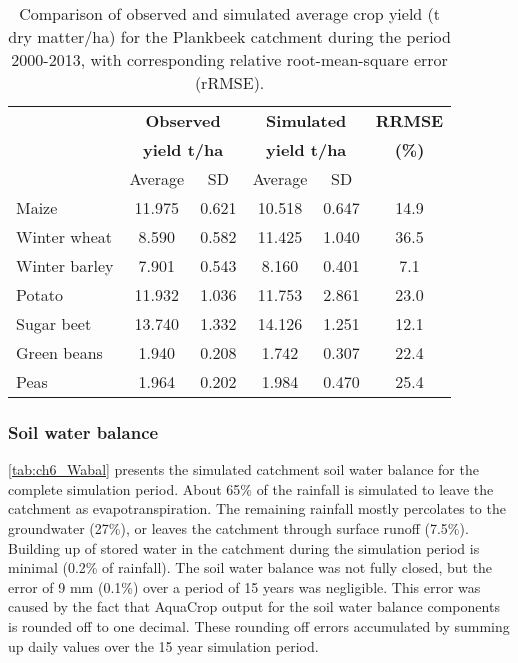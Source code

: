 \begin{table}[htbp]
  \centering
  	\caption{Comparison of observed and simulated average crop yield (t dry matter/ha) for the Plankbeek catchment during the period 2000-2013, with corresponding relative root-mean-square error (rRMSE). }
\begin{tabular}{lccccc}
\toprule
      & \multicolumn{2}{c}{\textbf{Observed}} & \multicolumn{2}{c}{\textbf{Simulated}} & \multicolumn{1}{c}{\textbf{RRMSE}} \\
      & \multicolumn{2}{c}{\textbf{yield \si{t/ha}}} & \multicolumn{2}{c}{\textbf{yield \si{t/ha}}} & \textbf{(\%)} \\
      & Average & SD    & Average & SD    & \multicolumn{1}{l}{} \\
\midrule
Maize & 11.975 & 0.621 & 10.518 & 0.647 & 14.9 \\
Winter wheat  & 8.590 & 0.582 & 11.425 & 1.040 & 36.5 \\
Winter barley  & 7.901 & 0.543 & 8.160 & 0.401 & 7.1 \\
Potato & 11.932 & 1.036 & 11.753 & 2.861 & 23.0 \\
Sugar beet & 13.740 & 1.332 & 14.126 & 1.251 & 12.1 \\
Green beans & 1.940 & 0.208 & 1.742 & 0.307 & 22.4 \\
Peas  & 1.964 & 0.202 & 1.984 & 0.470 & 25.4 \\
\bottomrule
\end{tabular}%

  \label{tab:ch6_YieldPerf}%
  \end{table}

\subsubsection{Soil water balance}
\autoref{tab:ch6_Wabal} presents the simulated catchment soil water balance for the complete simulation period. About 65\% of the rainfall is simulated to leave the catchment as evapotranspiration. The remaining rainfall mostly percolates to the groundwater (27\%), or leaves the catchment through surface runoff (7.5\%). Building up of stored water in the catchment during the simulation period is minimal (0.2\% of rainfall). The soil water balance was not fully closed, but the error of 9 mm (0.1\%) over a period of 15 years was negligible. This error was caused by the fact that AquaCrop output for the soil water balance components is rounded off to one decimal. These rounding off errors accumulated by summing up daily values over the 15 year simulation period. 

